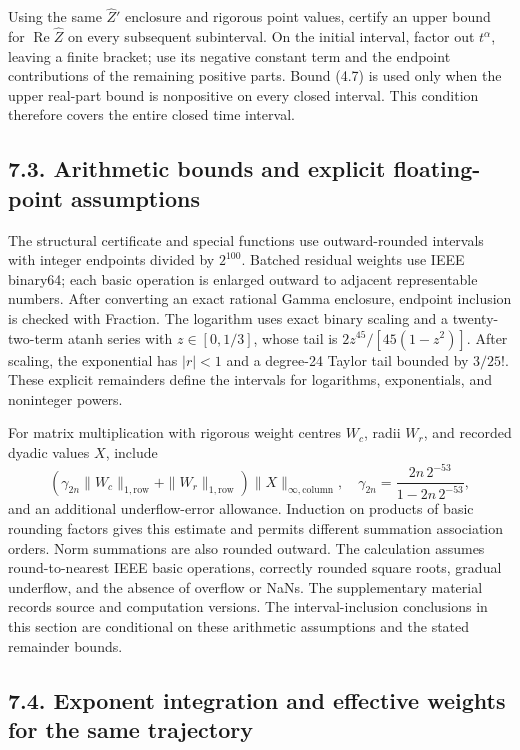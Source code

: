 \documentclass[a4paper,11pt]{article}
\begin{document}
Using the same \(\widehat Z'\) enclosure and rigorous point values, certify an upper bound for \(\operatorname{Re}\widehat Z\) on every subsequent subinterval. On the initial interval, factor out \(t^\alpha\), leaving a finite bracket; use its negative constant term and the endpoint contributions of the remaining positive parts. Bound (4.7) is used only when the upper real-part bound is nonpositive on every closed interval. This condition therefore covers the entire closed time interval.

\subsection*{7.3. Arithmetic bounds and explicit floating-point assumptions}

The structural certificate and special functions use outward-rounded intervals with integer endpoints divided by \(2^{100}\). Batched residual weights use IEEE binary64; each basic operation is enlarged outward to adjacent representable numbers. After converting an exact rational Gamma enclosure, endpoint inclusion is checked with Fraction. The logarithm uses exact binary scaling and a twenty-two-term atanh series with \(z\in[0,1/3]\), whose tail is \(2z^{45}/[45(1-z^2)]\). After scaling, the exponential has \(|r|<1\) and a degree-24 Taylor tail bounded by \(3/25!\). These explicit remainders define the intervals for logarithms, exponentials, and noninteger powers.

For matrix multiplication with rigorous weight centres \(W_c\), radii \(W_r\), and recorded dyadic values \(X\), include
\[
\left(\gamma_{2n}\|W_c\|_{1,\mathrm{row}}+
\|W_r\|_{1,\mathrm{row}}\right)\|X\|_{\infty,\mathrm{column}},
\quad \gamma_{2n}=\frac{2n\,2^{-53}}{1-2n\,2^{-53}},
\tag{7.9}
\]
and an additional underflow-error allowance. Induction on products of basic rounding factors gives this estimate and permits different summation association orders. Norm summations are also rounded outward. The calculation assumes round-to-nearest IEEE basic operations, correctly rounded square roots, gradual underflow, and the absence of overflow or NaNs. The supplementary material records source and computation versions. The interval-inclusion conclusions in this section are conditional on these arithmetic assumptions and the stated remainder bounds.

\subsection*{7.4. Exponent integration and effective weights for the same trajectory}
\end{document}

